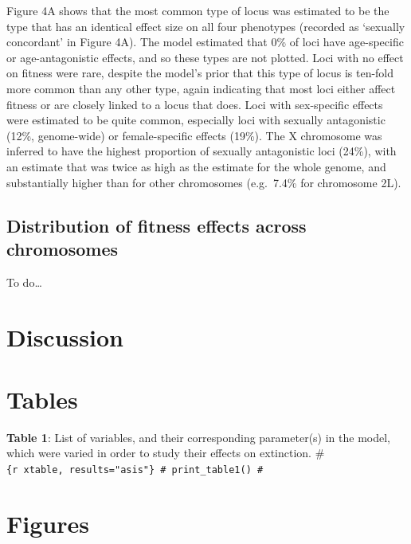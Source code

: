 \documentclass{article}
\begin{document}
Figure 4A shows that the most common type of locus was estimated to be
the type that has an identical effect size on all four phenotypes
(recorded as `sexually concordant' in Figure 4A). The model estimated
that 0\% of loci have age-specific or age-antagonistic effects, and so
these types are not plotted. Loci with no effect on fitness were rare,
despite the model's prior that this type of locus is ten-fold more
common than any other type, again indicating that most loci either
affect fitness or are closely linked to a locus that does. Loci with
sex-specific effects were estimated to be quite common, especially loci
with sexually antagonistic (12\%, genome-wide) or female-specific
effects (19\%). The X chromosome was inferred to have the highest
proportion of sexually antagonistic loci (24\%), with an estimate that
was twice as high as the estimate for the whole genome, and
substantially higher than for other chromosomes (e.g.~7.4\% for
chromosome 2L).

\subsection*{Distribution of fitness effects across chromosomes}

To do\ldots{}

\section*{Discussion}

\newpage
\section*{Tables}

\textbf{Table 1}: List of variables, and their corresponding
parameter(s) in the model, which were varied in order to study their
effects on extinction. \#
\texttt{\{r\ xtable,\ results="asis"\}\ \#\ print\_table1()\ \#}

\newpage
\section*{Figures}



\end{document}
